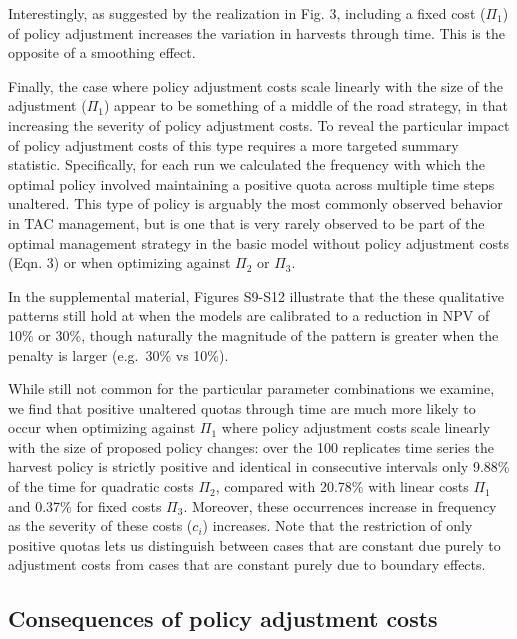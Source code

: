 \documentclass[review,12pt,author-year,titlepage]{components/elsarticle} %
\begin{document}
\begin{flushleft}
Interestingly, as suggested by the realization in Fig. 3, including a
fixed cost (\(\Pi_1\)) of policy adjustment increases the variation in
harvests through time. This is the opposite of a smoothing effect.

Finally, the case where policy adjustment costs scale linearly with the
size of the adjustment (\(\Pi_1\)) appear to be something of a middle of
the road strategy, in that increasing the severity of policy adjustment
costs. To reveal the particular impact of policy adjustment costs of
this type requires a more targeted summary statistic. Specifically, for
each run we calculated the frequency with which the optimal policy
involved maintaining a positive quota across multiple time steps
unaltered. This type of policy is arguably the most commonly observed
behavior in TAC management, but is one that is very rarely observed to
be part of the optimal management strategy in the basic model without
policy adjustment costs (Eqn. 3) or when optimizing against \(\Pi_2\) or
\(\Pi_3\).

In the supplemental material, Figures S9-S12 illustrate that the these
qualitative patterns still hold at when the models are calibrated to a
reduction in NPV of 10\% or 30\%, though naturally the magnitude of the
pattern is greater when the penalty is larger (e.g.~30\% vs 10\%).

While still not common for the particular parameter combinations we
examine, we find that positive unaltered quotas through time are much
more likely to occur when optimizing against \(\Pi_1\) where policy
adjustment costs scale linearly with the size of proposed policy
changes: over the 100 replicates time series the harvest policy is
strictly positive and identical in consecutive intervals only 9.88\% of
the time for quadratic costs \(\Pi_2\), compared with 20.78\% with
linear costs \(\Pi_1\) and 0.37\% for fixed costs \(\Pi_3\). Moreover,
these occurrences increase in frequency as the severity of these costs
(\(c_i\)) increases. Note that the restriction of only positive quotas
lets us distinguish between cases that are constant due purely to
adjustment costs from cases that are constant purely due to boundary
effects.

\subsection{Consequences of policy adjustment
costs}\label{consequences-of-policy-adjustment-costs}


\end{flushleft}
\end{document}
